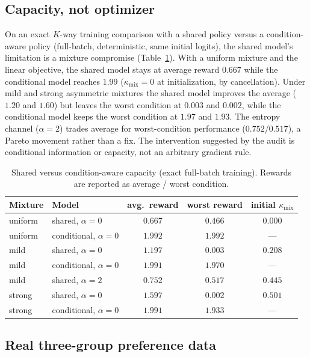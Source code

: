 \documentclass{article}
\newcommand{\kmix}{\kappa_{\mathrm{mix}}}
\begin{document}
\subsection{Capacity, not optimizer}
\label{sec:exp-capacity}

On an exact $K$-way training comparison with a shared policy versus a
condition-aware policy (full-batch, deterministic, same initial logits), the
shared model's limitation is a mixture compromise
(Table~\ref{tab:capacity}). With a uniform mixture and the linear objective,
the shared model stays at average reward $0.667$ while the conditional model
reaches $1.99$ ($\kmix=0$ at initialization, by cancellation). Under mild and
strong asymmetric mixtures the shared model improves the average ($1.20$ and
$1.60$) but leaves the worst condition at $0.003$ and $0.002$, while the
conditional model keeps the worst condition at $1.97$ and $1.93$. The entropy channel ($\alpha=2$) trades average for worst-condition
performance ($0.752$/$0.517$), a Pareto movement rather than a fix. The intervention suggested by the audit is
conditional information or capacity, not an arbitrary gradient rule.

\begin{table}[t]
\caption{Shared versus condition-aware capacity (exact full-batch training).
Rewards are reported as average / worst condition.}
\label{tab:capacity}
\begin{center}
\begin{tabular}{llccc}
\toprule
Mixture & Model & avg.\ reward & worst reward & initial $\kmix$ \\
\midrule
uniform & shared, $\alpha{=}0$ & $0.667$ & $0.466$ & $0.000$ \\
uniform & conditional, $\alpha{=}0$ & $1.992$ & $1.992$ & — \\
mild & shared, $\alpha{=}0$ & $1.197$ & $0.003$ & $0.208$ \\
mild & conditional, $\alpha{=}0$ & $1.991$ & $1.970$ & — \\
mild & shared, $\alpha{=}2$ & $0.752$ & $0.517$ & $0.445$ \\
strong & shared, $\alpha{=}0$ & $1.597$ & $0.002$ & $0.501$ \\
strong & conditional, $\alpha{=}0$ & $1.991$ & $1.933$ & — \\
\bottomrule
\end{tabular}
\end{center}
\end{table}

\subsection{Real three-group preference data}
\label{sec:exp-dices}
\end{document}
